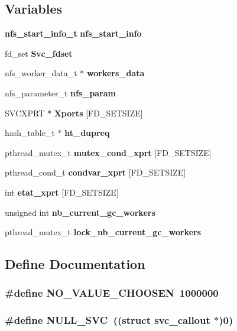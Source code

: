 \subsection*{Variables}
\begin{DoxyCompactItemize}
\item 
{\bf nfs\_\-start\_\-info\_\-t} {\bf nfs\_\-start\_\-info}
\item 
fd\_\-set {\bf Svc\_\-fdset}
\item 
nfs\_\-worker\_\-data\_\-t $\ast$ {\bf workers\_\-data}
\item 
nfs\_\-parameter\_\-t {\bf nfs\_\-param}
\item 
SVCXPRT $\ast$ {\bf Xports} [FD\_\-SETSIZE]
\item 
hash\_\-table\_\-t $\ast$ {\bf ht\_\-dupreq}
\item 
pthread\_\-mutex\_\-t {\bf mutex\_\-cond\_\-xprt} [FD\_\-SETSIZE]
\item 
pthread\_\-cond\_\-t {\bf condvar\_\-xprt} [FD\_\-SETSIZE]
\item 
int {\bf etat\_\-xprt} [FD\_\-SETSIZE]
\item 
unsigned int {\bf nb\_\-current\_\-gc\_\-workers}
\item 
pthread\_\-mutex\_\-t {\bf lock\_\-nb\_\-current\_\-gc\_\-workers}
\end{DoxyCompactItemize}


\subsection{Define Documentation}
\subsubsection[{NO\_\-VALUE\_\-CHOOSEN}]{\setlength{\rightskip}{0pt plus 5cm}\#define NO\_\-VALUE\_\-CHOOSEN~1000000}\label{nfs__rpc__dispatcher__thread_8c_a25424ceb074d9f56b67d1ff02ad8734d}
\subsubsection[{NULL\_\-SVC}]{\setlength{\rightskip}{0pt plus 5cm}\#define NULL\_\-SVC~((struct svc\_\-callout $\ast$)0)}\label{nfs__rpc__dispatcher__thread_8c_abeb67fae7e2b65e73240da098c71fc61}


